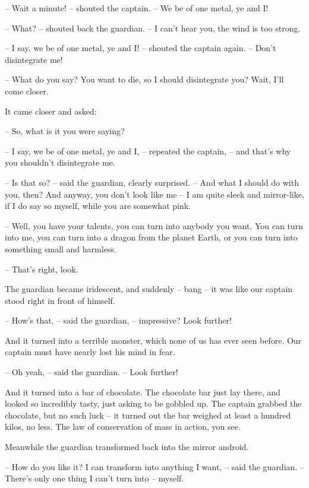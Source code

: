 \documentclass[ebook,oneside,final,openright]{memoir}
\begin{document}
– Wait a minute! – shouted the captain. – We be of one metal, ye and I!\par
– What? – shouted back the guardian. – I can’t hear you, the wind is too strong.\par
– I say, we be of one metal, ye and I! – shouted the captain again. – Don’t disintegrate me!\par
– What do you say? You want to die, so I should disintegrate you? Wait, I’ll come closer.\par
\par
It came closer and asked:\par
– So, what is it you were saying?\par
– I say, we be of one metal, ye and I, – repeated the captain, – and that’s why you shouldn’t disintegrate me.\par
– Is that so? – said the guardian, clearly surprised. – And what I should do with you, then? And anyway, you don’t look like me – I am quite sleek and mirror-like, if I do say so myself, while you are somewhat pink.\par
– Well, you have your talents, you can turn into anybody you want. You can turn into me, you can turn into a dragon from the planet Earth, or you can turn into something small and harmless.\par
– That’s right, look.\par
\par
The guardian became iridescent, and suddenly – bang – it was like our captain stood right in front of himself.\par
– How’s that, – said the guardian, – impressive? Look further!\par
And it turned into a terrible monster, which none of us has ever seen before. Our captain must have nearly lost his mind in fear.\par
– Oh yeah, – said the guardian. – Look further!\par
\par
And it turned into a bar of chocolate. The chocolate bar just lay there, and looked so incredibly tasty, just asking to be gobbled up. The captain grabbed the chocolate, but no such luck – it turned out the bar weighed at least a hundred kilos, no less. The law of conservation of mass in action, you see.\par
\par
Meanwhile the guardian transformed back into the mirror android.\par
– How do you like it? I can transform into anything I want, – said the guardian. – There’s only one thing I can’t turn into – myself.\par
\end{document}
